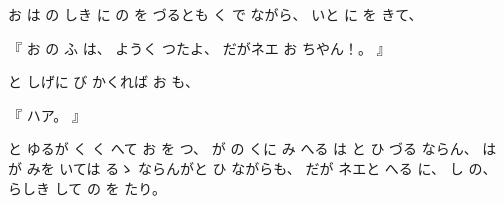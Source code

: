 
%
お
は
の
しき
に
の
を
づるとも
く
で
ながら、
%
いと
に
を
きて、

%
『
お
の
ふ
は、
%
ようく
つたよ、
%
だがネエ
お
ちやん！。
』

%
と
しげに
び
かくれば
お
も、

%
『
ハア。
』

%
と
ゆるが
く
く
へて
お
を
つ、
%
が
の
くに
み
へる
は
と
ひ
づる
ならん、
%
は
が
みを
いては
るゝ
ならんがと
ひ
ながらも、
%
だが
ネエと
へる
に、
%
し
の、
%
らしき
して
の
を
たり。


